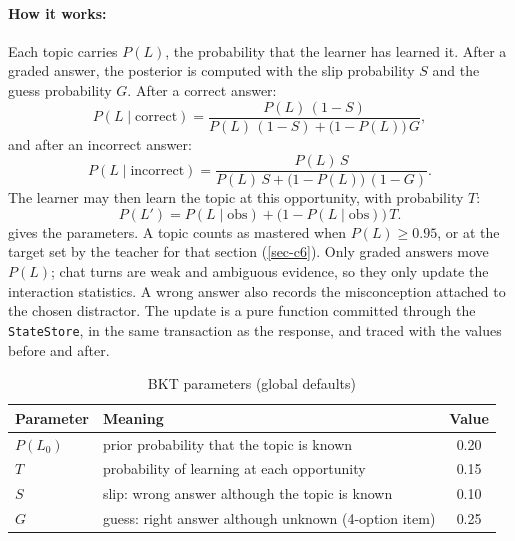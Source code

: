 \paragraph{How it works:} Each topic carries $P(L)$, the probability that
the learner has learned it. After a graded answer, the posterior is
computed with the slip probability $S$ and the guess probability $G$.
After a correct answer:
\begin{equation}
  P(L \mid \text{correct}) =
  \frac{P(L)\,(1-S)}{P(L)\,(1-S) + \bigl(1-P(L)\bigr)\,G},
  \label{eq-bkt-correct}
\end{equation}
and after an incorrect answer:
\begin{equation}
  P(L \mid \text{incorrect}) =
  \frac{P(L)\,S}{P(L)\,S + \bigl(1-P(L)\bigr)\,(1-G)}.
  \label{eq-bkt-incorrect}
\end{equation}
The learner may then learn the topic at this opportunity, with
probability $T$:
\begin{equation}
  P(L') = P(L \mid \text{obs}) + \bigl(1 - P(L \mid \text{obs})\bigr)\,T.
  \label{eq-bkt-learn}
\end{equation}
 gives the parameters. A topic counts as mastered
when $P(L) \geq 0.95$, or at the target set by the teacher for that
section (\cref{sec-c6}). Only graded answers move $P(L)$; chat turns are
weak and ambiguous evidence, so they only update the interaction
statistics. A wrong answer also records the misconception attached to the
chosen distractor. The update is a pure function committed through the
\texttt{StateStore}, in the same transaction as the response, and traced
with the values before and after.

\begin{table}[htbp]
\centering
\caption{BKT parameters (global defaults)}
\label{tab-bkt-params}
\small
\begin{tabular}{@{}llc@{}}
\toprule
\textbf{Parameter} & \textbf{Meaning} & \textbf{Value} \\
\midrule
$P(L_0)$ & prior probability that the topic is known & 0.20 \\
$T$ & probability of learning at each opportunity & 0.15 \\
$S$ & slip: wrong answer although the topic is known & 0.10 \\
$G$ & guess: right answer although unknown (4-option item) & 0.25 \\
\bottomrule
\end{tabular}
\end{table}

